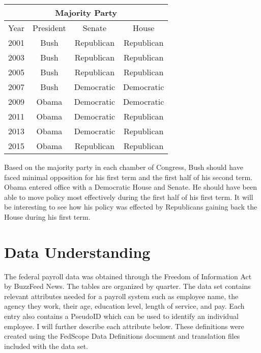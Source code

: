 \documentclass{article}
\begin{document}
        \begin{center}
            \begin{tabular}{ |c|c|c|c| }
                \hline
                \multicolumn{4}{|c|}{Majority Party} \\
                \hline
                Year & President & Senate & House \\
                \hline
                2001 & Bush & Republican & Republican \\
                2003 & Bush & Republican & Republican \\
                2005 & Bush & Republican & Republican \\
                2007 & Bush & Democratic & Democratic \\
                2009 & Obama & Democratic & Democratic \\
                2011 & Obama & Democratic & Republican \\
                2013 & Obama & Democratic & Republican \\
                2015 & Obama & Republican & Republican \\
                \hline
            \end{tabular}
        \end{center}

    Based on the majority party in each chamber of Congress, Bush should have faced minimal opposition for his first term and the first half of his second term. Obama entered office with a Democratic House and Senate. He should have been able to move policy most effectively during the first half of his first term. It will be interesting to see how his policy was effected by Republicans gaining back the House during his first term.

\section{Data Understanding}
The federal payroll data was obtained through the Freedom of Information Act by BuzzFeed News. The tables are organized by quarter. The data set contains relevant attributes needed for a payroll system such as employee name, the agency they work, their age, education level, length of service, and pay. Each entry also contains a PseudoID which can be used to identify an individual employee. I will further describe each attribute below. These definitions were created using the FedScope Data Definitions document and translation files included with the data set.\cite{datadefs}
\end{document}
